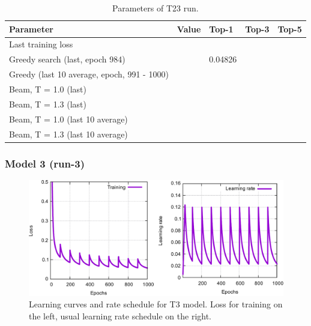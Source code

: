 \documentclass{article}
\begin{document}
\begin{table}[h!]
\caption{Parameters of T23 run.}
  \centering
  \begin{tabular}{p{8.2cm}p{1.5cm}p{1.5cm}p{1.5cm}p{1.5cm}}
    \toprule
    Parameter & Value & Top-1 & Top-3 & Top-5 \\
    \midrule
    Last training loss &  & & & \\
    \midrule
    Greedy search (last, epoch 984) & & 0.04826 & & \\
    Greedy (last 10 average, epoch, 991 - 1000) & &  & & \\
    \midrule
    Beam, T = 1.0 (last) & &  &  &   \\
    Beam, T = 1.3 (last) & &  &   &  \\ 
    \midrule
    Beam, T = 1.0 (last 10 average) & &   &  &  \\
    Beam, T = 1.3 (last 10 average) & &   &   &  \\ 
    \bottomrule
  \end{tabular}
  \label{tbl:t11}

\end{table} 

 
 \newpage
 \subsubsection{Model 3 (run-3)}
 
\begin{figure}[h!]
  \centering
  \includegraphics[width = 16.5cm]{images/t3-1.pdf}
  \caption{Learning curves and rate schedule for T3 model. Loss for training on the left, usual learning rate schedule on the right.}
  \label{fig:t11}
\end{figure}
\end{document}

